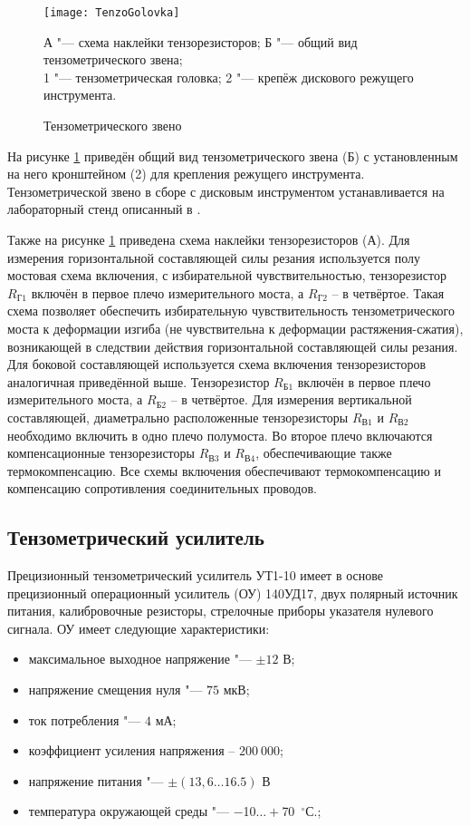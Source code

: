 \begin{figure} [htbp]
	\center
	\texttt{[image: TenzoGolovka]}
	
	А "--- схема наклейки тензорезисторов; Б "--- общий вид тензометрического звена;\\
	1 "--- тензометрическая головка; 2 "--- крепёж дискового режущего инструмента.
	\caption{Тензометрического звено} 
	\label{img:TenzoGolovka}  
\end{figure}

На рисунке \ref{img:TenzoGolovka} приведён общий вид тензометрического звена (Б) с установленным на него кронштейном (2) для крепления режущего инструмента. Тензометрической звено в сборе с дисковым инструментом устанавливается на лабораторный стенд описанный в \todo{[ссылки]}.

Также на рисунке \ref{img:TenzoGolovka} приведена схема наклейки тензорезисторов (А). Для измерения горизонтальной составляющей силы резания используется полу мостовая схема включения, с избирательной чувствительностью, тензорезистор $R_{\text{Г}1}$ включён в первое плечо измерительного моста, а $R_{\text{Г}2}$ – в четвёртое. Такая схема позволяет обеспечить избирательную чувствительность тензометрического моста к деформации изгиба (не чувствительна к деформации растяжения-сжатия), возникающей в следствии действия горизонтальной составляющей силы резания. Для боковой составляющей используется схема включения тензорезисторов аналогичная приведённой выше. Тензорезистор $R_{\text{Б}1}$ включён в первое плечо измерительного моста, а $R_{\text{Б}2}$ – в четвёртое. Для измерения вертикальной составляющей, диаметрально расположенные тензорезисторы $R_{\text{В}1}$ и $R_{\text{В}2}$ необходимо включить в одно плечо полумоста. Во второе плечо включаются компенсационные тензорезисторы $R_{\text{В}3}$ и $R_{\text{В}4}$, обеспечивающие также термокомпенсацию. Все схемы включения обеспечивают термокомпенсацию и компенсацию сопротивления соединительных проводов.


\subsection{Тензометрический усилитель}\label{subsect2_4_2}

Прецизионный тензометрический усилитель УТ1-10 имеет в основе прецизионный операционный усилитель (ОУ) 140УД17, двух полярный источник питания, калибровочные резисторы, стрелочные приборы указателя нулевого сигнала. ОУ имеет следующие характеристики:
\begin{itemize}
	\item максимальное выходное напряжение "--- $\pm12$ В;
	\item напряжение смещения нуля "--- $75$ мкВ;
	\item ток потребления "--- $4$ мА;
	\item коэффициент усиления напряжения – $200~000$;
	\item напряжение питания "--- $\pm(13,6\ldots16.5)$ В
	\item температура окружающей среды "--- $-$10$\ldots+$70~${}^\circ$С.;
\end{itemize}

